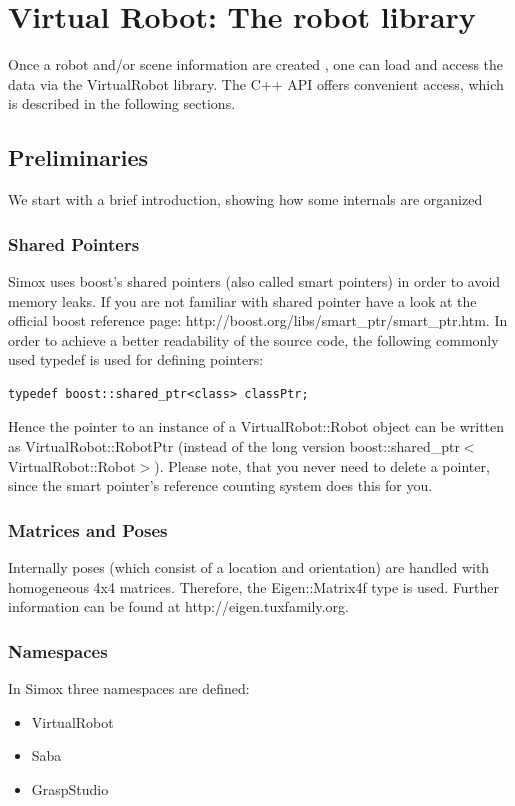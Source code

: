 \documentclass{book}
\begin{document}
\section{Virtual Robot: The robot library}
Once a robot and/or scene information are created , one can load and access the data via the VirtualRobot library. The C++ API offers convenient access, which is described in the following sections. 
\par
\subsection{Preliminaries}
We start with a brief introduction, showing how some internals are organized 
\par
\subsubsection{Shared Pointers}
Simox uses boost's shared pointers (also called smart pointers) in order to avoid memory leaks. If you are not familiar with shared pointer have a look at the official boost reference page: http://boost.org/libs/smart\_ptr/smart\_ptr.htm. In order to achieve a better readability of the source code, the following commonly used typedef is used for defining pointers: 
\begin{lstlisting}
typedef boost::shared_ptr<class> classPtr;
\end{lstlisting}
Hence the pointer to an instance of a VirtualRobot::Robot object can be written as VirtualRobot::RobotPtr (instead of the long version boost::shared\_ptr$<$VirtualRobot::Robot$>$). Please note, that you never need to delete a pointer, since the smart pointer's reference counting system does this for you. 
\subsubsection{Matrices and Poses}
Internally poses (which consist of a location and orientation) are handled with homogeneous 4x4 matrices. Therefore, the Eigen::Matrix4f type is used. Further information can be found at http://eigen.tuxfamily.org. 
\par
\subsubsection{Namespaces}
In Simox three namespaces are defined: 
\begin{itemize}
\item VirtualRobot
\item Saba
\item GraspStudio
\end{itemize}
\end{document}
